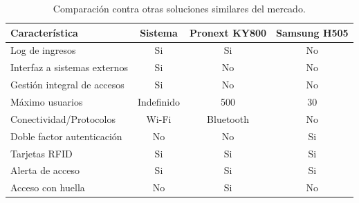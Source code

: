 \begin{table}[h]
	\centering
	\caption[Comparación contra otras soluciones similares del mercado]{Comparación contra otras soluciones similares del mercado.}
	\begin{tabular}{l c c c}   
		\toprule
		\textbf{Característica} & 
		\textbf{Sistema } & 
		\textbf{Pronext KY800} &	
		\textbf{Samsung H505}    
		\\
		\midrule
		Log de ingresos  & Si  & Si & No \\		
		Interfaz a sistemas externos & Si & No & No \\		
		Gestión integral de accesos & Si & No & No \\		
		Máximo usuarios & Indefinido & 500  & 30  \\		
		Conectividad/Protocolos & Wi-Fi & Bluetooth & No  \\		
		Doble factor autenticación & No  & No & Si \\
		Tarjetas RFID  & Si  & Si  & Si \\
		Alerta de acceso  & Si & Si & Si \\
		Acceso con huella & No & Si & No \\
		\bottomrule
		\hline
	\end{tabular}
	\label{tab:comparacionfinal}
\end{table}